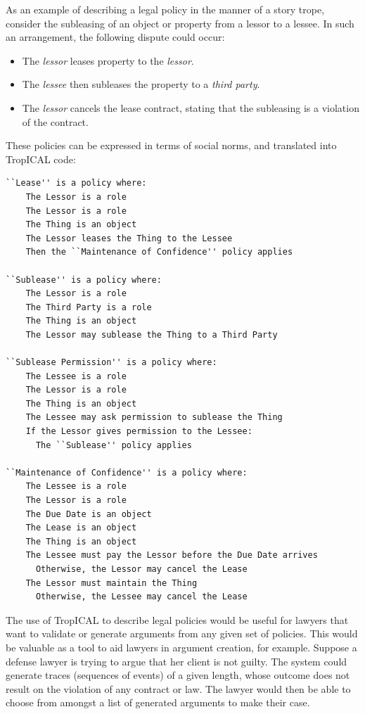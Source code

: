 \documentclass[11pt]{report}
\begin{document}
As an example of describing a legal policy in the manner of a story trope,
consider the subleasing of an object or property from a lessor to a lessee. In
such an arrangement, the following dispute could occur:

\begin{itemize}
  \item The \emph{lessor} leases property to the \emph{lessor}.
  \item The \emph{lessee} then subleases the property to a \emph{third party}.
  \item The \emph{lessor} cancels the lease contract, stating that the
    subleasing is a violation of the contract.
\end{itemize}

These policies can be expressed in terms of social norms, and translated into
TropICAL code:

\begin{lstlisting}[label={list:policies},caption={Example policies in TropICAL}]
``Lease'' is a policy where:
    The Lessor is a role
    The Lessor is a role
    The Thing is an object
    The Lessor leases the Thing to the Lessee
    Then the ``Maintenance of Confidence'' policy applies

``Sublease'' is a policy where:
    The Lessor is a role
    The Third Party is a role
    The Thing is an object
    The Lessor may sublease the Thing to a Third Party 

``Sublease Permission'' is a policy where:
    The Lessee is a role
    The Lessor is a role
    The Thing is an object
    The Lessee may ask permission to sublease the Thing
    If the Lessor gives permission to the Lessee:
      The ``Sublease'' policy applies

``Maintenance of Confidence'' is a policy where:
    The Lessee is a role
    The Lessor is a role
    The Due Date is an object
    The Lease is an object
    The Thing is an object
    The Lessee must pay the Lessor before the Due Date arrives
      Otherwise, the Lessor may cancel the Lease
    The Lessor must maintain the Thing
      Otherwise, the Lessee may cancel the Lease
\end{lstlisting}

The use of TropICAL to describe legal policies would be useful for lawyers that
want to validate or generate arguments from any given set of policies. This would be valuable as a tool
to aid lawyers in argument creation, for example.
Suppose a defense lawyer is trying to argue that her client
is not guilty. The system could generate traces (sequences of events) of a
given length, whose outcome does not result on the violation of any contract
or law. The lawyer would then be able to choose from amongst a list of
generated arguments to make their case. 
\end{document}
